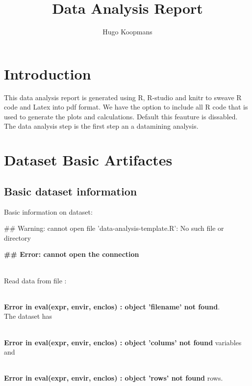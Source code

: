 \documentclass[10pt,a4paper,titlepage]{report}\usepackage{graphicx, color}
\author{Hugo Koopmans}
\title{Data Analysis Report}
\makeatletter
\newenvironment{kframe}{%
 \def\at@end@of@kframe{}%
 \ifinner\ifhmode%
  \def\at@end@of@kframe{\end{minipage}}%
  \begin{minipage}{\columnwidth}%
 \fi\fi%
 \def\FrameCommand##1{\hskip\@totalleftmargin \hskip-\fboxsep
 \colorbox{shadecolor}{##1}\hskip-\fboxsep
     \hskip-\linewidth \hskip-\@totalleftmargin \hskip\columnwidth}%
 \MakeFramed {\advance\hsize-\width
   \@totalleftmargin\z@ \linewidth\hsize
   \@setminipage}}%
 {\par\unskip\endMakeFramed%
 \at@end@of@kframe}
\newenvironment{knitrout}{}{} %
\makeatother
\begin{document}
\maketitle
\tableofcontents
\newpage
\section{Introduction}
This data analysis report is generated using R, R-studio and knitr to sweave R code and Latex into pdf format. We have the option to include all R code that is used to generate the plots and calculations. Default this feauture is dissabled.\\
The data analysis step is the first step an a datamining analysis.
\section{Dataset Basic Artifactes}

\subsection{Basic dataset information}
Basic information on dataset:\\
\begin{knitrout}
\color{fgcolor}\begin{kframe}


{\ttfamily\noindent\textcolor{warningcolor}{\#\# Warning: cannot open file 'data-analysis-template.R': No such file or directory}}

{\ttfamily\noindent\bfseries\textcolor{errorcolor}{\#\# Error: cannot open the connection}}\end{kframe}
\end{knitrout}





\\
Read data from file : 

{\ttfamily\noindent\bfseries\textcolor{errorcolor}{\\Error in eval(expr, envir, enclos) : object 'filename' not found}}.\\
The dataset has 

{\ttfamily\noindent\bfseries\textcolor{errorcolor}{\\Error in eval(expr, envir, enclos) : object 'colums' not found}} variables and 

{\ttfamily\noindent\bfseries\textcolor{errorcolor}{\\Error in eval(expr, envir, enclos) : object 'rows' not found}} rows.
\end{document}
